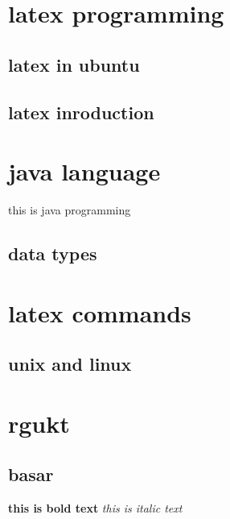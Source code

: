 \documentclass{article}
\begin{document}
	\tableofcontents
	
	\newpage
	\section{latex programming} \label{sec:intro}
	\subsection{latex in ubuntu}
	\subsection{latex inroduction}
	\section{java language} \label{sec:java}
	this is java programming
	\subsection{data types}
	\section{latex commands}
	\subsection{unix and linux}
	\section{rgukt}
	\subsection{basar}
	\textbf{this is bold text}
	\textit{this is italic text}
	
	
	
	
\end{document}
